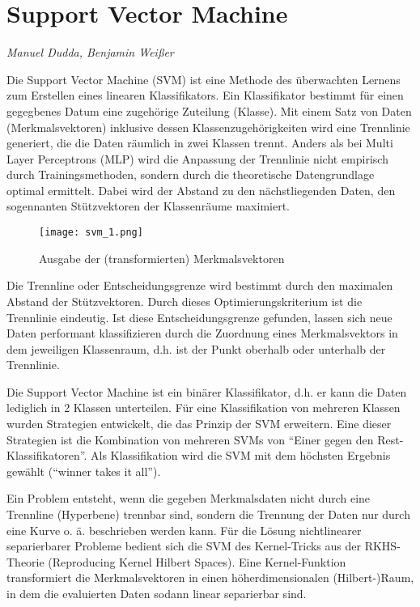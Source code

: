 \section{Support Vector Machine}
\textit{Manuel Dudda, Benjamin Weißer}

Die Support Vector Machine (SVM) ist eine Methode des überwachten Lernens zum Erstellen eines linearen Klassifikators. Ein Klassifikator bestimmt für einen gegegbenes Datum eine zugehörige Zuteilung (Klasse). Mit einem Satz von Daten (Merkmalsvektoren) inklusive dessen Klassenzugehörigkeiten wird eine Trennlinie generiert, die die Daten räumlich in zwei Klassen trennt. Anders als bei Multi Layer Perceptrons (MLP) wird die Anpassung der Trennlinie nicht empirisch durch Trainingsmethoden, sondern durch die theoretische Datengrundlage optimal ermittelt. Dabei wird der Abstand zu den nächstliegenden Daten, den sogennanten Stützvektoren der Klassenräume maximiert.

\begin{figure}[h!]
  \centering
    \texttt{[image: svm\_1.png]}
  \caption{Ausgabe der (transformierten) Merkmalsvektoren}
\end{figure}

Die Trennline oder Entscheidungsgrenze wird bestimmt durch den maximalen Abstand der Stützvektoren. Durch dieses Optimierungskriterium ist die Trennlinie eindeutig. Ist diese Entscheidungsgrenze gefunden, lassen sich neue Daten performant klassifizieren durch die Zuordnung eines Merkmalsvektors in dem jeweiligen Klassenraum, d.h. ist der Punkt oberhalb oder unterhalb der Trennlinie.

Die Support Vector Machine ist ein binärer Klassifikator, d.h. er kann die Daten lediglich in 2 Klassen unterteilen. Für eine Klassifikation von mehreren Klassen wurden Strategien entwickelt, die das Prinzip der SVM erweitern. Eine dieser Strategien ist die Kombination von mehreren SVMs von “Einer gegen den Rest-Klassifikatoren”. Als Klassifikation wird die SVM mit dem höchsten Ergebnis gewählt (“winner takes it all”).

Ein Problem entsteht, wenn die gegeben Merkmalsdaten nicht durch eine Trennline (Hyperbene) trennbar sind, sondern die Trennung der Daten nur durch eine Kurve o. ä. beschrieben werden kann. Für die Lösung nichtlinearer separierbarer Probleme bedient sich die SVM des Kernel-Tricks aus der RKHS-Theorie (Reproducing Kernel Hilbert Spaces). Eine Kernel-Funktion transformiert die Merkmalsvektoren in einen höherdimensionalen (Hilbert-)Raum, in dem die evaluierten Daten sodann linear separierbar sind.

